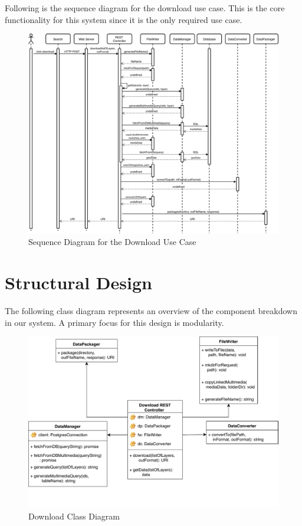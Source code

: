 \documentclass{article}
\begin{document}
Following is the sequence diagram for the download use case. This is the core functionality for this system since it is the only required use case. 

\begin{figure}[H]
	\begin{center}
		\caption{Sequence Diagram for the Download Use Case}
		\includegraphics[width=\textwidth]{images/sequence_diagram.pdf}
	\end{center}
\end{figure}

\clearpage

\section{Structural Design}

The following class diagram represents an overview of the component breakdown in our system. 
A primary focus for this design is modularity.  

\begin{figure}[H]
	\begin{center}
		\caption{Download Class Diagram}
		\includegraphics[width=\textwidth]{images/class_diagram.pdf}
	\end{center}
\end{figure}
\end{document}
